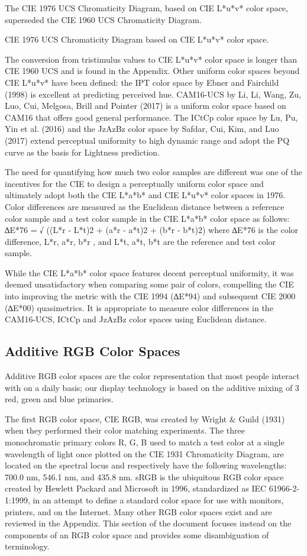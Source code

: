 The CIE 1976 UCS Chromaticity Diagram, based on CIE L*u*v* color space, superseded the CIE 1960 UCS Chromaticity Diagram.

CIE 1976 UCS Chromaticity Diagram based on CIE L*u*v* color space.

The conversion from tristimulus values to CIE L*u*v* color space is longer than CIE 1960 UCS and is found in the Appendix.
Other uniform color spaces beyond CIE L*u*v* have been defined: the IPT color space by Ebner and Fairchild (1998) is excellent at predicting perceived hue. CAM16-UCS by Li, Li, Wang, Zu, Luo, Cui, Melgosa, Brill and Pointer (2017) is a uniform color space based on CAM16 that offers good general performance. The ICtCp color space by Lu, Pu, Yin et al. (2016) and the JzAzBz color space by Safdar, Cui, Kim, and Luo (2017) extend perceptual uniformity to high dynamic range and adopt the PQ curve as the basis for Lightness prediction.

The need for quantifying how much two color samples are different was one of the incentives for the CIE to design a perceptually uniform color space and ultimately adopt both the CIE L*a*b* and CIE L*u*v* color spaces in 1976. Color differences are measured as the Euclidean distance between a reference color sample and a test color sample in the CIE L*a*b* color space as follows:
∆E*76 = √ ((L*r - L*t)2 + (a*r - a*t)2  + (b*r - b*t)2)
where ∆E*76 is the color difference, L*r, a*r, b*r , and L*t, a*t, b*t are the reference and test color sample.

While the CIE L*a*b* color space features decent perceptual uniformity, it was deemed unsatisfactory when comparing some pair of colors, compelling the CIE into improving the metric with the CIE 1994 (∆E*94) and subsequent CIE 2000  (∆E*00)  quasimetrics. It is appropriate to measure color differences in the CAM16-UCS, ICtCp and JzAzBz color spaces using Euclidean distance.

\subsection{Additive RGB Color Spaces}%
\label{subsec:additive-rgb-color-spaces}

Additive RGB color spaces are the color representation that most people interact with on a daily basis; our display technology is based on the additive mixing of 3 red, green and blue primaries.

The first RGB color space, CIE RGB, was created by Wright & Guild (1931) when they performed their color matching experiments. The three monochromatic primary colors R, G, B used to match a test color at a single wavelength of light once plotted on the CIE 1931 Chromaticity Diagram, are located on the spectral locus and respectively have the following wavelengths: 700.0 nm, 546.1 nm, and 435.8 nm. sRGB is the ubiquitous RGB color space created by Hewlett Packard and Microsoft in 1996, standardized as IEC 61966-2-1:1999, in an attempt to define a standard color space for use with monitors, printers, and on the Internet. Many other RGB color spaces exist and are reviewed in the Appendix. This section of the document focuses instead on the components of an RGB color space and provides some disambiguation of terminology.

